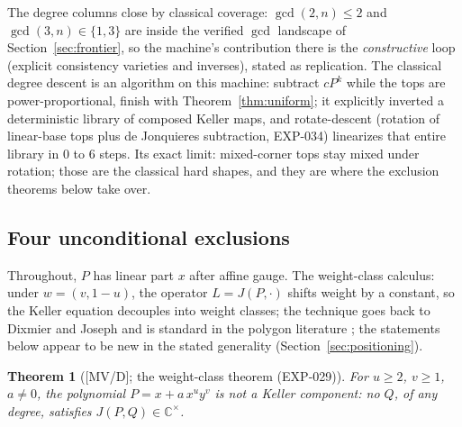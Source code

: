 \documentclass[11pt]{article}
\newtheorem{theorem}{Theorem}[section]
\theoremstyle{remark}
\newcommand{\C}{\mathbb{C}}
\begin{document}
The degree columns close by classical coverage: $\gcd(2, n) \le 2$ and $\gcd(3, n) \in
\{1, 3\}$ are inside the verified $\gcd$ landscape of Section~\ref{sec:frontier}, so the
machine's contribution there is the \emph{constructive} loop (explicit consistency varieties
and inverses), stated as replication. The classical degree descent is an algorithm on this
machine: subtract $c P^k$ while the tops are power-proportional, finish with
Theorem~\ref{thm:uniform}; it explicitly inverted a deterministic library of composed Keller
maps, and rotate-descent (rotation of linear-base tops plus de Jonquieres subtraction,
EXP-034) linearizes that entire library in $0$ to $6$ steps. Its exact limit: mixed-corner
tops stay mixed under rotation; those are the classical hard shapes, and they are where the
exclusion theorems below take over.

\subsection{Four unconditional exclusions}

Throughout, $P$ has linear part $x$ after affine gauge. The weight-class calculus: under
$w = (v, 1 - u)$, the operator $L=J(P, \cdot)$ shifts weight by a constant, so the Keller
equation decouples into weight classes; the technique goes back to Dixmier and Joseph
\cite{Joseph1975} and is standard in the polygon literature \cite{GGV2017}; the statements
below appear to be new in the stated generality (Section~\ref{sec:positioning}).

\begin{theorem}[{[MV/D]}; the weight-class theorem (EXP-029)]\label{thm:t1}
For $u \ge 2$, $v \ge 1$, $a \ne 0$, the polynomial $P = x + a\,x^u y^v$ is not a Keller
component: no $Q$, of any degree, satisfies $J(P, Q) \in \C^\times$.
\end{theorem}
\end{document}
